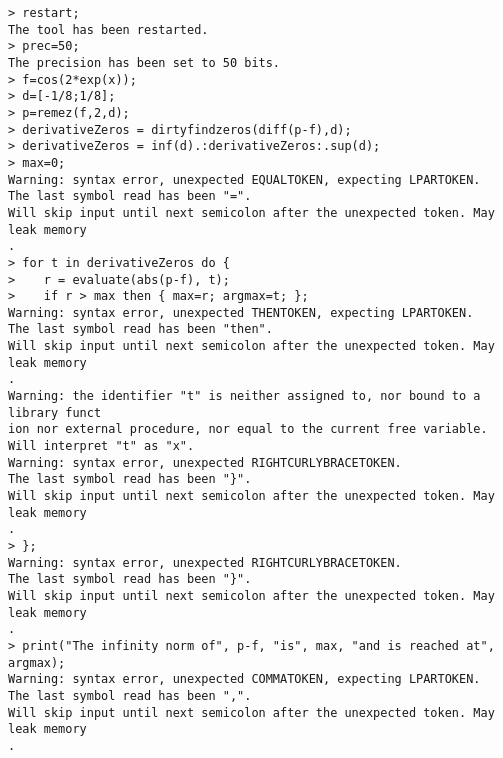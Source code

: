 \begin{center}\begin{minipage}{15cm}\begin{Verbatim}[frame=single]
> restart;
The tool has been restarted.
> prec=50;
The precision has been set to 50 bits.
> f=cos(2*exp(x));
> d=[-1/8;1/8];
> p=remez(f,2,d);
> derivativeZeros = dirtyfindzeros(diff(p-f),d);
> derivativeZeros = inf(d).:derivativeZeros:.sup(d);
> max=0;
Warning: syntax error, unexpected EQUALTOKEN, expecting LPARTOKEN.
The last symbol read has been "=".
Will skip input until next semicolon after the unexpected token. May leak memory
.
> for t in derivativeZeros do {
>    r = evaluate(abs(p-f), t);
>    if r > max then { max=r; argmax=t; };
Warning: syntax error, unexpected THENTOKEN, expecting LPARTOKEN.
The last symbol read has been "then".
Will skip input until next semicolon after the unexpected token. May leak memory
.
Warning: the identifier "t" is neither assigned to, nor bound to a library funct
ion nor external procedure, nor equal to the current free variable.
Will interpret "t" as "x".
Warning: syntax error, unexpected RIGHTCURLYBRACETOKEN.
The last symbol read has been "}".
Will skip input until next semicolon after the unexpected token. May leak memory
.
> };
Warning: syntax error, unexpected RIGHTCURLYBRACETOKEN.
The last symbol read has been "}".
Will skip input until next semicolon after the unexpected token. May leak memory
.
> print("The infinity norm of", p-f, "is", max, "and is reached at", argmax);
Warning: syntax error, unexpected COMMATOKEN, expecting LPARTOKEN.
The last symbol read has been ",".
Will skip input until next semicolon after the unexpected token. May leak memory
.
\end{Verbatim}
\end{minipage}\end{center}
